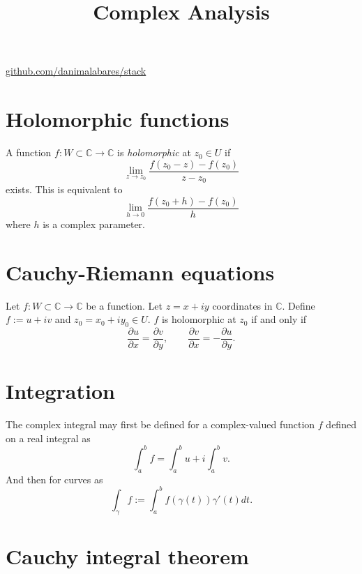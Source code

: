 



\title{Complex Analysis}
\maketitle

\label{section-phantom}
\hfill
\href{http://github.com/danimalabares/stack}{github.com/danimalabares/stack}

\tableofcontents

\section{Holomorphic functions}
\label{section-holomorphic-functions}

\begin{definition}
\label{definition-holomorphic-function}
A function $f:W\subset \mathbb{C} \to \mathbb{C}$ is {\it holomorphic} at $z_0
\in U$ if
$$
\lim_{z\to z_0} \frac{f(z_0-z)-f(z_0)}{z-z_0}
$$
exists. This is equivalent to
$$
\lim_{h\to 0} \frac{f(z_0+h)-f(z_0)}{h}
$$
where $h$ is a complex parameter.
\end{definition}

\section{Cauchy-Riemann equations}
\label{section-Cauchy-Riemann-equations}

\begin{theorem}
\label{theorem-Cauchy-Riemann}
Let $f:W\subset\mathbb{C}\to \mathbb{C}$ be a function. Let $z=x+iy$ coordinates
in $\mathbb{C}$. Define $f:=u+iv$ and
$z_0=x_0+iy_0 \in U$. $f$ is holomorphic at $z_0$ if and only if
$$
\frac{\partial u}{\partial x}=\frac{\partial v}{\partial y},\qquad
\frac{\partial v}{\partial x}=-\frac{\partial u}{\partial y}.
$$
\end{theorem}

\section{Integration}
\label{section-integration}

\noindent
The complex integral may first be defined for a complex-valued function $f$
defined on a real integral as
$$
\int_a^bf=\int_a^b u + i \int_a^bv.
$$
And then for curves as
$$
\int_\gamma f:=\int_a^b f(\gamma(t))\gamma'(t)dt.
$$
\section{Cauchy integral theorem}
\label{section-cauchy-integral}

